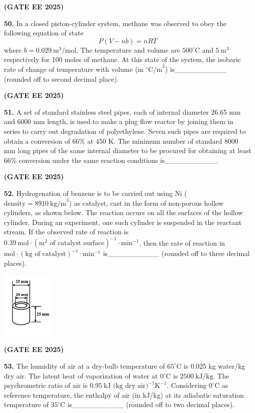 \documentclass[journal,12pt,onecolumn]{IEEEtran}
\newcommand{\brak}[1]{(#1)}
\begin{document}
\hfill \textbf{\brak{GATE EE 2025}}

\noindent\textbf{50.} In a closed piston-cylinder system, methane was observed to obey the following equation of state
\[ P\brak{V-nb}=nRT \]
where $b=0.029~\text{m}^{3}/\text{mol}$. The temperature and volume are $500^{\circ}\text{C}$ and $5~\text{m}^{3}$ respectively for 100 moles of methane. At this state of the system, the isobaric rate of change of temperature with volume \brak{in $^{\circ}\text{C/m}^{3}$} is\_\_\_\_\_\_\_\_\_\_ \brak{rounded off to second decimal place}.

\hfill \textbf{\brak{GATE EE 2025}}

\noindent\textbf{51.} A set of standard stainless steel pipes, each of internal diameter 26.65 mm and 6000 mm length, is used to make a plug flow reactor by joining them in series to carry out degradation of polyethylene. Seven such pipes are required to obtain a conversion of 66\% at 450 K. The minimum number of standard 8000 mm long pipes of the same internal diameter to be procured for obtaining at least 66\% conversion under the same reaction conditions is\_\_\_\_\_\_\_\_\_\_.


\hfill \textbf{\brak{GATE EE 2025}}

\noindent\textbf{52.} Hydrogenation of benzene is to be carried out using Ni \brak{$\text{density} = 8910~\text{kg/m}^{3}$} as catalyst, cast in the form of non-porous hollow cylinders, as shown below. The reaction occurs on all the surfaces of the hollow cylinder. During an experiment, one such cylinder is suspended in the reactant stream. If the observed rate of reaction is $0.39~\text{mol}\cdot\brak{\text{m}^2 \text{ of catalyst surface}}^{-1}\cdot\text{min}^{-1}$, then the rate of reaction in $\text{mol}\cdot\brak{\text{kg of catalyst}}^{-1}\cdot\text{min}^{-1}$ is\_\_\_\_\_\_\_\_\_\_ \brak{rounded off to three decimal places}.
\begin{center}
\includegraphics[width=0.2\textwidth]{figs/52.png}
\end{center}

\hfill \textbf{\brak{GATE EE 2025}}

\noindent\textbf{53.} The humidity of air at a dry-bulb temperature of $65^{\circ}\text{C}$ is 0.025 kg water/kg dry air. The latent heat of vaporization of water at $0^{\circ}\text{C}$ is $2500~\text{kJ/kg}$. The psychrometric ratio of air is $0.95~\text{kJ \brak{kg dry air}}^{-1}\text{K}^{-1}$. Considering $0^{\circ}\text{C}$ as reference temperature, the enthalpy of air \brak{in kJ/kg} at its adiabatic saturation temperature of $35^{\circ}\text{C}$ is\_\_\_\_\_\_\_\_\_\_ \brak{rounded off to two decimal places}.
\end{document}
